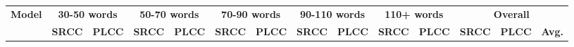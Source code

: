 \documentclass[letterpaper]{article} %
\begin{document}
\begin{table}[t]
	\centering
	
	\small %
	\setlength{\tabcolsep}{1mm} %
	
	\begin{tabular}{l|ll|ll|ll|ll|ll|lll}
		\toprule
		\multirow{2}{*}[-0.65ex]{\textbf{Model}} & \multicolumn{2}{c|}{\textbf{30-50 words}} & \multicolumn{2}{c|}{\textbf{50-70 words}} & \multicolumn{2}{c|}{\textbf{70-90 words}} & \multicolumn{2}{c|}{\textbf{90-110 words}} & \multicolumn{2}{c|}{\textbf{110+ words}} & \multicolumn{3}{c}{\textbf{Overall}} \\
		\cmidrule(lr){2-3} \cmidrule(lr){4-5} \cmidrule(lr){6-7} \cmidrule(lr){8-9} \cmidrule(lr){10-11} \cmidrule(lr){12-14}
		
		& \textbf{SRCC} & \textbf{PLCC} & \textbf{SRCC} & \textbf{PLCC} & \textbf{SRCC} & \textbf{PLCC} & \textbf{SRCC} & \textbf{PLCC} & \textbf{SRCC} & \textbf{PLCC} & \textbf{SRCC} & \textbf{PLCC} & \textbf{Avg.} \\
		\midrule 
		

\end{tabular}
\end{table}
\end{document}
